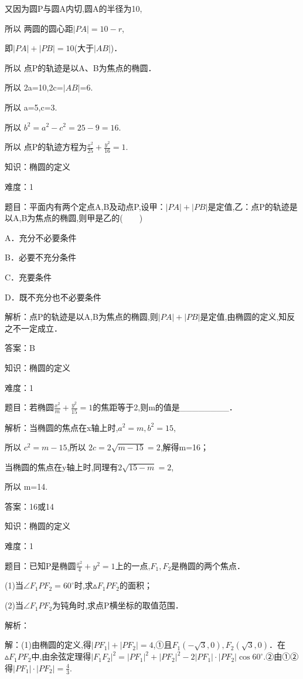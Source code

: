 \documentclass{article} %
\begin{document}
又因为圆P与圆A内切,圆A的半径为10,

所以 两圆的圆心距$|PA|=10-r$,

即$|PA|+|PB|=10$(大于$|AB|$)．

所以 点P的轨迹是以A、B为焦点的椭圆．

所以 2a=10,2c=$|AB|$=6.

所以 a=5,c=3.

所以 $b^{2}=a^{2}-c^{2}=25-9=16$.

所以 点P的轨迹方程为$\frac{x^2}{25}+\frac{y^2}{16}=1$.



知识：椭圆的定义

难度：1

题目：平面内有两个定点A,B及动点P,设甲：$|PA|+|PB|$是定值,乙：点P的轨迹是以A,B为焦点的椭圆,则甲是乙的(　　)

A．充分不必要条件   

B．必要不充分条件

C．充要条件   

D．既不充分也不必要条件

解析：点P的轨迹是以A,B为焦点的椭圆,则$|PA|+|PB|$是定值,由椭圆的定义,知反之不一定成立．

答案：B



知识：椭圆的定义

难度：1

题目：若椭圆$\frac{x^2}{m}+\frac{y^2}{15}=1$的焦距等于2,则m的值是\_\_\_\_\_\_\_\_．

解析：当椭圆的焦点在x轴上时,$a^{2}=m,b^{2}=15$,

所以 $c^{2}=m-15$,所以 $2c=2\sqrt{m-15}=2$,解得m=16；

当椭圆的焦点在y轴上时,同理有$2\sqrt{15-m}=2$,

所以 m=14.

答案：16或14



知识：椭圆的定义

难度：1

题目：已知P是椭圆$\frac{x^2}{4}+y^{2}=1$上的一点,$F_{1},F_{2}$是椭圆的两个焦点．

(1)当${\angle}F_{1}PF_{2}=60^{\circ}$时,求${\vartriangle}F_{1}PF_{2}$的面积；

(2)当${\angle}F_{1}PF_{2}$为钝角时,求点P横坐标的取值范围．

解析：

解：(1)由椭圆的定义,得$|PF_1|+|PF_2|=4$,①且$F_{1}(-\sqrt{3},0),F_{2}(\sqrt{3},0)$．在${\vartriangle}F_{1}PF_{2}$中,由余弦定理得$|F_1F_2|^2=|PF_1|^2+|PF_2|^2-2|PF_1|\cdot |PF_2|\cos 60^{\circ}$.②由①②得$|PF_1|\cdot |PF_2|=\frac{4}{3}$.
\end{document}
